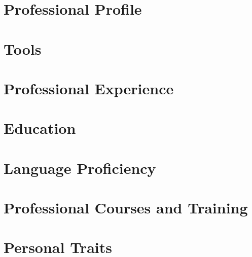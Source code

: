 \documentclass[letter,10pt]{article}
\begin{document}
\section{Professional Profile}


\section{Tools}


\section{Professional Experience}


\section{Education}


\newpage

\section{Language Proficiency}


\section{Professional Courses and Training}


\section{Personal Traits}

\end{document}
